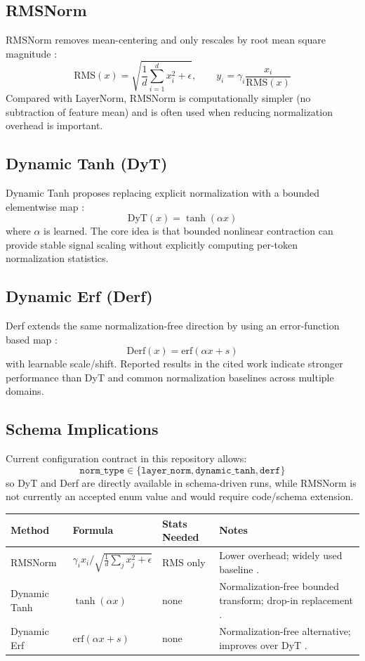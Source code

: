 \documentclass[11pt,a4paper]{article}
\begin{document}
\subsection{RMSNorm}
RMSNorm removes mean-centering and only rescales by root mean square magnitude \citep{zhang_root_2019}:
\[
\mathrm{RMS}(x)=\sqrt{\frac{1}{d}\sum_{i=1}^{d}x_i^2+\epsilon},\qquad
y_i=\gamma_i\frac{x_i}{\mathrm{RMS}(x)}
\]
Compared with LayerNorm, RMSNorm is computationally simpler (no subtraction of feature mean) and is often used when reducing normalization overhead is important.

\subsection{Dynamic Tanh (DyT)}
Dynamic Tanh proposes replacing explicit normalization with a bounded elementwise map \citep{zhu_transformers_2025}:
\[
\mathrm{DyT}(x)=\tanh(\alpha x)
\]
where $\alpha$ is learned. The core idea is that bounded nonlinear contraction can provide stable signal scaling without explicitly computing per-token normalization statistics.

\subsection{Dynamic Erf (Derf)}
Derf extends the same normalization-free direction by using an error-function based map \citep{chen_stronger_2025}:
\[
\mathrm{Derf}(x)=\mathrm{erf}(\alpha x+s)
\]
with learnable scale/shift. Reported results in the cited work indicate stronger performance than DyT and common normalization baselines across multiple domains.

\subsection{Schema Implications}
Current configuration contract in this repository allows:
\[
\texttt{norm\_type}\in\{\texttt{layer\_norm},\texttt{dynamic\_tanh},\texttt{derf}\}
\]
so DyT and Derf are directly available in schema-driven runs, while RMSNorm is not currently an accepted enum value and would require code/schema extension.

\scriptsize
\begin{longtable}{p{2.2cm}p{3.4cm}p{2.0cm}p{4.0cm}}
\toprule
\textbf{Method} & \textbf{Formula} & \textbf{Stats Needed} & \textbf{Notes} \\
\midrule
\endhead
RMSNorm & $\gamma_i x_i/\sqrt{\frac{1}{d}\sum_j x_j^2+\epsilon}$ & RMS only & Lower overhead; widely used baseline \citep{zhang_root_2019}. \\
Dynamic Tanh & $\tanh(\alpha x)$ & none & Normalization-free bounded transform; drop-in replacement \citep{zhu_transformers_2025}. \\
Dynamic Erf & $\mathrm{erf}(\alpha x+s)$ & none & Normalization-free alternative; improves over DyT \citep{chen_stronger_2025}. \\
\bottomrule
\end{longtable}
\normalsize
\end{document}
